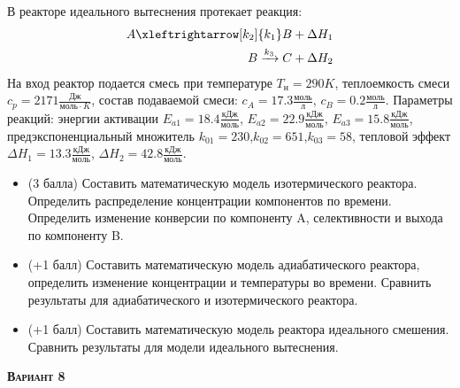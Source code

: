  В реакторе идеального вытеснения протекает реакция: \begin{equation*} \begin{aligned} A \xleftrightarrow[k_2]{k_1} B + \Delta H_1 \\ B \xrightarrow{k_3} C + \Delta H_2 \end{aligned} \end{equation*}                                      На вход  реактор подается смесь при температуре $ T_н =  290 K$, теплоемкость смеси $c_p= 2171 \frac{Дж}{моль \cdot K}$, состав подаваемой смеси: $c_A=17.3 \frac{моль}{л}$, $c_B=0.2 \frac{моль}{л}$. Параметры реакций: энергии активации $E_{a1}=18.4 \frac{кДж}{моль}$, $E_{a2}=22.9  \frac{кДж}{моль}$, $E_{a3}=15.8  \frac{кДж}{моль}$, предэкспоненциальный множитель $k_{01}=       230$,$k_{02}=       651$,$k_{03}=        58$, тепловой эффект $\Delta H_1= 13.3  \frac{кДж}{моль}$, $\Delta H_2=42.8 \frac{кДж}{моль}$.\begin{itemize} \item (3 балла) Составить математическую модель изотермического реактора. Определить распределение концентрации компонентов по времени. Определить изменение конверсии по компоненту A, селективности и выхода по компоненту B. \item (+1 балл) Составить математическую модель адиабатического реактора, определить изменение концентрации и температуры во времени. Сравнить результаты для адиабатического и изотермического реактора. \item (+1 балл) Составить математическую модель реактора идеального смешения. Сравнить результаты для модели идеального вытеснения. \end{itemize}

\textsc{\textbf{Вариант 8}}

